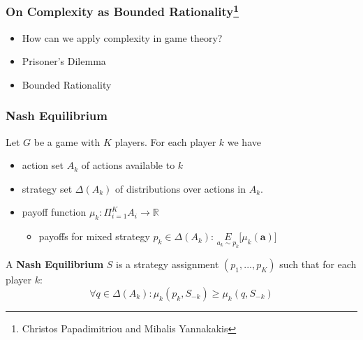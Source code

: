\documentclass{beamer}
\begin{document}
\begin{frame}
	\frametitle{On Complexity as Bounded Rationality\footnote{Christos Papadimitriou and Mihalis Yannakakis}}
	
	\begin{itemize}
		\item How can we apply complexity in game theory?
		\item Prisoner's Dilemma
		\item Bounded Rationality
	\end{itemize}
	
\end{frame}

\begin{frame}
	\frametitle{Nash Equilibrium}
	Let $G$ be a game with $K$ players. For each player $k$ we have
	\begin{itemize}
		\item action set $A_k$ of actions available to $k$
		\item strategy set $\Delta(A_k)$ of distributions over actions in $A_k$.
		\item payoff function $\mu_k: \Pi_{i=1}^K A_i \longrightarrow \mathbb{R}$
		\begin{itemize}
			\item payoffs for mixed strategy $p_k \in \Delta(A_k)$: $\underset{a_k \sim p_k}{E}\lbrack \mu_k(\textbf{a}) \rbrack$
		\end{itemize}
	\end{itemize}
	
	A \textbf{Nash Equilibrium} $S$ is a strategy assignment $(p_1,..., p_K)$ such that for each player $k$:
	\begin{equation}
	\forall q \in \Delta(A_k): \mu_k(p_k, S_{-k}) \ge \mu_k(q, S_{-k})
	\end{equation}
	
\end{frame}
\end{document}
